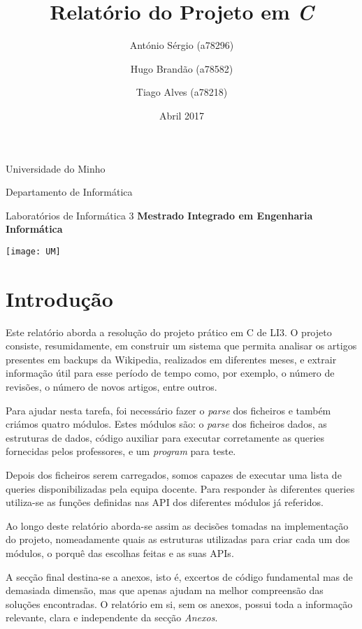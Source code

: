 \documentclass{article}
\title{\bf{\textcolor{Mahogany}{Relatório do Projeto em \emph{C}}}}
\author{António Sérgio (a78296) \and Hugo Brandão (a78582) \and Tiago Alves (a78218) }
\date{Abril 2017}
\begin{document}
\maketitle
\begin{center}

\par
\large {Universidade do Minho}
\par
\large {Departamento de Informática}
\par
\large {Laboratórios de Informática 3}
\vfill
\bf Mestrado Integrado em Engenharia Informática
\par
\texttt{[image: UM]}
\end{center}

\newpage

\tableofcontents

\newpage

\section{Introdução}

\par Este relatório aborda a resolução do projeto prático em C de LI3. O projeto consiste, resumidamente, em construir um sistema que permita analisar os artigos presentes em backups da Wikipedia, realizados em diferentes meses, e extrair informação útil para esse período de tempo como, por exemplo, o número de revisões, o número de novos artigos, entre outros.
\par Para ajudar nesta tarefa, foi necessário fazer o \emph{parse} dos ficheiros e também criámos quatro módulos. Estes módulos são: o \emph{parse} dos ficheiros dados, as estruturas de dados,  código auxiliar para executar corretamente as queries fornecidas pelos professores, e um \emph{program} para teste.
\par Depois dos ficheiros serem carregados, somos capazes de executar uma lista de queries disponibilizadas pela equipa docente. Para responder às diferentes queries utiliza-se as funções definidas nas API dos diferentes módulos já referidos.
\par Ao longo deste relatório aborda-se assim as decisões tomadas na implementação do projeto, nomeadamente quais as estruturas utilizadas para criar cada um dos módulos, o porquê das escolhas feitas e as suas APIs.
\par A secção final destina-se a anexos, isto é, excertos de código fundamental mas de demasiada dimensão, mas que apenas ajudam na melhor compreensão das soluções encontradas. O relatório em si, sem os anexos, possui toda a informação relevante, clara e independente da secção \emph{Anexos}.
\end{document}
